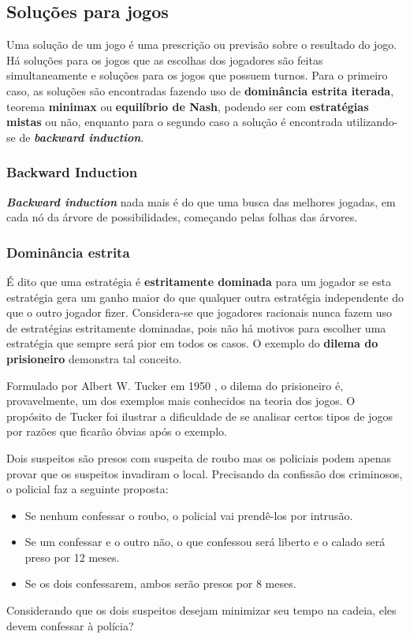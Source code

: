 \subsection{Soluções para jogos}
Uma solução de um jogo é uma prescrição ou previsão sobre o resultado do jogo. Há soluções para os jogos que as escolhas dos jogadores são feitas simultaneamente e soluções para os jogos que possuem turnos. Para o primeiro caso, as soluções são encontradas fazendo uso de \textbf{dominância estrita iterada}, teorema \textbf{minimax} ou \textbf{equilíbrio de Nash}, podendo ser com \textbf{estratégias mistas} ou não, enquanto para o segundo caso a solução é encontrada utilizando-se de \textbf{\emph{backward induction}}.

\subsubsection{Backward Induction}
\textbf{\emph{Backward induction}} nada mais é do que uma busca das melhores jogadas, em cada nó da árvore de possibilidades, começando pelas folhas das árvores.

\subsubsection{Dominância estrita}

É dito que uma estratégia é {\bfseries estritamente dominada} para um jogador se esta estratégia gera um ganho maior do que qualquer outra estratégia independente do que o outro jogador fizer. Considera-se que jogadores racionais nunca fazem uso de estratégias estritamente dominadas, pois não há motivos para escolher uma estratégia que sempre será pior em todos os casos. O exemplo do {\bfseries dilema do prisioneiro} demonstra tal conceito.

Formulado por Albert W. Tucker em 1950 \cite{sartini_IIbienaldasbm}, o dilema do prisioneiro é, provavelmente, um dos exemplos mais conhecidos na teoria dos jogos. O propósito de Tucker foi ilustrar a dificuldade de se analisar certos tipos de jogos por razões que ficarão óbvias após o exemplo.

\begin{myex}\label{ex:dilema-do-prisioneiro}
Dois suspeitos são presos com suspeita de roubo mas os policiais podem apenas provar que os suspeitos invadiram o local. Precisando da confissão dos criminosos, o policial faz a seguinte proposta:
\begin{itemize}
	\tightlist
	\item Se nenhum confessar o roubo, o policial vai prendê-los por intrusão.
	\item Se um confessar e o outro não, o que confessou será liberto e o calado será preso por 12 meses.
	\item Se os dois confessarem, ambos serão presos por 8 meses.
\end{itemize}
Considerando que os dois suspeitos desejam minimizar seu tempo na cadeia, eles devem confessar à polícia?
\end{myex}

